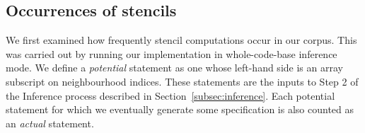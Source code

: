 \documentclass[9pt,preprint]{sigplanconf}
\theoremstyle{definition}
\begin{document}





\subsection{Occurrences of stencils}

We first examined how frequently stencil computations occur in our
corpus. This was carried out by running our implementation in 
whole-code-base inference mode. We define a \emph{potential} statement as one whose left-hand
side is an array subscript on neighbourhood indices. These statements
are the inputs to Step 2 of the Inference process described in 
Section~\ref{subsec:inference}. Each potential statement for which we
eventually generate some specification is also counted as
an \emph{actual} statement.
\end{document}
